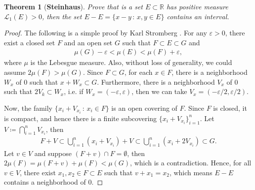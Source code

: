 \documentclass[11pt]{book}
\newtheorem{theorem}{Theorem}[chapter]
\theoremstyle{definition}
\numberwithin{equation}{chapter}
\begin{document}
\begin{theorem}[{\bf Steinhaus}]
Prove that is a set $E \subset \mathbb{R}$ has positive measure $\mathcal{L}_1(E) > 0$, then the set $E -E = \{x - y \,:\, x,y\in E\}$ contains an interval.
\end{theorem}
\begin{proof}
The following is a simple proof by Karl Stromberg \cite{30}. For any $\varepsilon > 0$, there exist a closed set $F$ and an open set $G$ such that $F \subset E \subset G$ and
\begin{align*}
    \mu(G) - \varepsilon < \mu(E) < \mu(F) + \varepsilon,
\end{align*}
where $\mu$ is the Lebesgue measure. Also, without loss of generality, we could assume $2 \mu(F) > \mu(G)$. Since $F \subset G$, for each $x \in F$, there is a neighborhood $W_x$ of $0$ such that $x + W_x \subset G$. Furthermore, there is a neighborhood $V_x$ of $0$ such that $2V_k \subset W_x$, i.e. if $W_x = (-\varepsilon,\varepsilon)$, then we can take $V_x = (-\varepsilon/2,\varepsilon/2)$.

Now, the family $\{x_i + V_{x_i} \,:\, x_i\in F \}$ is an open covering of $F$. Since $F$ is closed, it is compact, and hence there is a finite subcovering $\{x_i + V_{x_i}\}^n_{i=1}$. Let $V \coloneqq \bigcap^n_{i=1} V_{x_i}$, then
\begin{align*}
    F + V \subset \bigcup^n_{i=1} \left(x_i + V_{x_i}\right) + V \subset \bigcup^n_{i=1} \left(x_i + 2V_{x_i}\right) \subset G.
\end{align*}
Let $v \in V$ and suppose $(F + v) \cap F = \emptyset$, then $2 \mu(F) = \mu(F + v) + \mu(F) < \mu(G)$, which is a contradiction. Hence, for all $v \in V$, there exist $x_1, x_2 \in F \subset E$ such that $v + x_1 = x_2$, which means $E - E$ contains a neighborhood of $0$.
\end{proof}

\medskip
\end{document}
